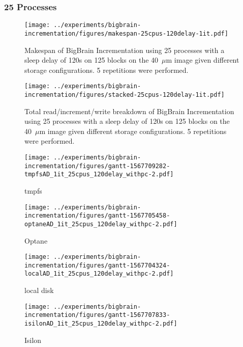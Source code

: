 \documentclass[conference]{IEEEtran}
\newcommand{\bigbrain}{BigBrain }
\begin{document}
\subsubsection{25 Processes}
\begin{figure}
    \texttt{[image: ../experiments/bigbrain-incrementation/figures/makespan-25cpus-120delay-1it.pdf]}
    \captionsetup{width=\columnwidth}
    \caption{Makespan of \bigbrain Incrementation using 25 processes with a sleep delay of 120s on 125 blocks on the 40~$\mu$m image given different storage configurations. 5 repetitions were performed.}\label{fig:makespan-25cpus}
\end{figure}
\begin{figure}
    \texttt{[image: ../experiments/bigbrain-incrementation/figures/stacked-25cpus-120delay-1it.pdf]}
    \captionsetup{width=\columnwidth}
    \caption{Total read/increment/write breakdown of \bigbrain Incrementation using 25 processes with a sleep delay of 120s on 125 blocks on the 40~$\mu$m image given different storage configurations. 5 repetitions were performed.}\label{fig:stacked-25cpus}
\end{figure}
\begin{figure*}
    \begin{subfigure}{\columnwidth}
        \centering
    \texttt{[image: ../experiments/bigbrain-incrementation/figures/gantt-1567709282-tmpfsAD\_1it\_25cpus\_120delay\_withpc-2.pdf]}
    \caption{tmpfs}
\end{subfigure}
\begin{subfigure}{\columnwidth}
        \centering
    \texttt{[image: ../experiments/bigbrain-incrementation/figures/gantt-1567705458-optaneAD\_1it\_25cpus\_120delay\_withpc-2.pdf]}
    \caption{Optane}
\end{subfigure}
\begin{subfigure}{\columnwidth}
        \centering
    \texttt{[image: ../experiments/bigbrain-incrementation/figures/gantt-1567704324-localAD\_1it\_25cpus\_120delay\_withpc-2.pdf]}
    \caption{local disk}
\end{subfigure}
\begin{subfigure}{\columnwidth}
        \centering
    \texttt{[image: ../experiments/bigbrain-incrementation/figures/gantt-1567707833-isilonAD\_1it\_25cpus\_120delay\_withpc-2.pdf]}
    \caption{Isilon}\label{fig:gantt25isilon}
\end{subfigure}
\caption{Gantt charts for each storage device (App Direct Mode) processing 125 blocks of the 40$\mu$m BigBrain using 25 processes and a sleep delay of 120s}\label{fig:gantt25}
\end{figure*}
\end{document}
